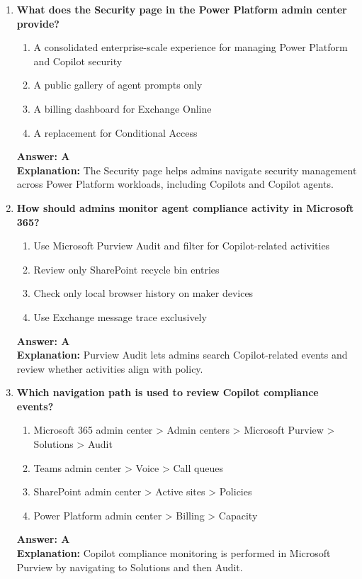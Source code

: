 \documentclass[10pt]{article}
\begin{document}
\begin{enumerate}[leftmargin=*]
\item \textbf{What does the Security page in the Power Platform admin center provide?}
\begin{enumerate}[label=\Alph*.]
  \item A consolidated enterprise-scale experience for managing Power Platform and Copilot security
  \item A public gallery of agent prompts only
  \item A billing dashboard for Exchange Online
  \item A replacement for Conditional Access
\end{enumerate}
\textbf{Answer: A}\\
\textbf{Explanation:} The Security page helps admins navigate security management across Power Platform workloads, including Copilots and Copilot agents.

\item \textbf{How should admins monitor agent compliance activity in Microsoft 365?}
\begin{enumerate}[label=\Alph*.]
  \item Use Microsoft Purview Audit and filter for Copilot-related activities
  \item Review only SharePoint recycle bin entries
  \item Check only local browser history on maker devices
  \item Use Exchange message trace exclusively
\end{enumerate}
\textbf{Answer: A}\\
\textbf{Explanation:} Purview Audit lets admins search Copilot-related events and review whether activities align with policy.

\item \textbf{Which navigation path is used to review Copilot compliance events?}
\begin{enumerate}[label=\Alph*.]
  \item Microsoft 365 admin center > Admin centers > Microsoft Purview > Solutions > Audit
  \item Teams admin center > Voice > Call queues
  \item SharePoint admin center > Active sites > Policies
  \item Power Platform admin center > Billing > Capacity
\end{enumerate}
\textbf{Answer: A}\\
\textbf{Explanation:} Copilot compliance monitoring is performed in Microsoft Purview by navigating to Solutions and then Audit.

\end{enumerate}
\end{document}
